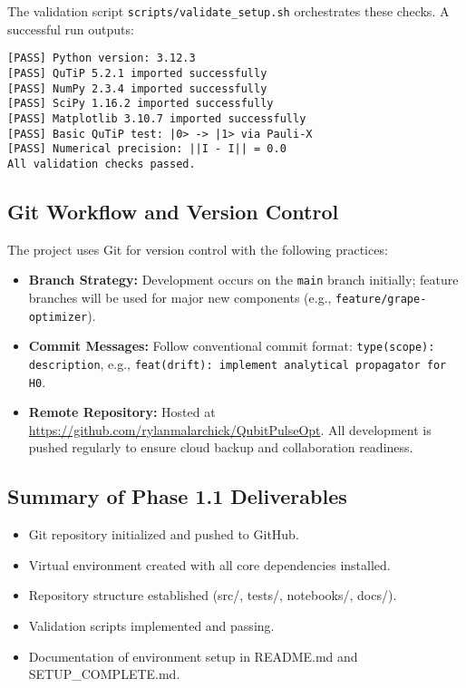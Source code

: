 \documentclass[11pt,a4paper]{article}
\theoremstyle{definition}
\theoremstyle{remark}
\begin{document}
The validation script \texttt{scripts/validate\_setup.sh} orchestrates these checks. A successful run outputs:

\begin{verbatim}
[PASS] Python version: 3.12.3
[PASS] QuTiP 5.2.1 imported successfully
[PASS] NumPy 2.3.4 imported successfully
[PASS] SciPy 1.16.2 imported successfully
[PASS] Matplotlib 3.10.7 imported successfully
[PASS] Basic QuTiP test: |0> -> |1> via Pauli-X
[PASS] Numerical precision: ||I - I|| = 0.0
All validation checks passed.
\end{verbatim}

\subsection{Git Workflow and Version Control}

The project uses Git for version control with the following practices:

\begin{itemize}
    \item \textbf{Branch Strategy:} Development occurs on the \texttt{main} branch initially; feature branches will be used for major new components (e.g., \texttt{feature/grape-optimizer}).
    \item \textbf{Commit Messages:} Follow conventional commit format: \texttt{type(scope): description}, e.g., \texttt{feat(drift): implement analytical propagator for H0}.
    \item \textbf{Remote Repository:} Hosted at \url{https://github.com/rylanmalarchick/QubitPulseOpt}. All development is pushed regularly to ensure cloud backup and collaboration readiness.
\end{itemize}

\subsection{Summary of Phase 1.1 Deliverables}

\begin{itemize}
    \item Git repository initialized and pushed to GitHub.
    \item Virtual environment created with all core dependencies installed.
    \item Repository structure established (src/, tests/, notebooks/, docs/).
    \item Validation scripts implemented and passing.
    \item Documentation of environment setup in README.md and SETUP\_COMPLETE.md.
\end{itemize}
\end{document}
